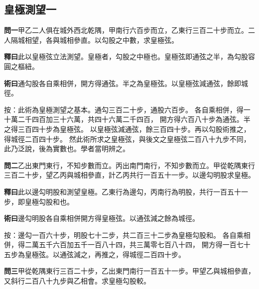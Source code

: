 \documentclass[12pt,a4paper]{article}
\newcommand{\Section}[1]{\subsection*{#1}}
\begin{document}
\Section{皇極測望一}

\noindent\textbf{問一}\quad 甲乙二人俱在城外西北乾隅，甲南行六百步而立，乙東行三百二十步而立。二人隔城相望，各與城相參直。以勾股之中數，求皇極弦。

\vspace{0.3em}

\noindent\textbf{釋曰}\quad 此以皇極弦立法測望。皇極者，勾股之中極也。皇極弦即通弦之半，為勾股容圓之樞紐。

\vspace{0.3em}

\noindent\textbf{術曰}\quad 通勾股各自乘相併，開方得通弦。半之為皇極弦。以皇極弦減通弦，餘即城徑。

\vspace{0.3em}

\noindent
按：此術為皇極測望之基本。通勾三百二十步，通股六百步。
各自乘相併，得一十萬二千四百加三十六萬，共四十六萬二千四百，
開方得六百八十步為通弦。半之得三百四十步為皇極弦。
以皇極弦減通弦，餘三百四十步。再以勾股術推之，得城徑二百四十步。
然此術所求之皇極弦，與後文之皇極弦二百八十九步不同，
此乃泛說，後為實數也。學者當明辨之。

\vspace{0.5em}

\noindent\textbf{問二}\quad 乙出東門東行，不知步數而立。丙出南門南行，不知步數而立。甲從乾隅東行三百二十步，望乙丙與城相參直，計乙丙共行一百五十一步。以邊勾明股求皇極。

\vspace{0.3em}

\noindent\textbf{釋曰}\quad 此以邊勾明股和測望皇極。乙東行為邊勾，丙南行為明股，共行一百五十一步，即皇極勾股和也。

\vspace{0.3em}

\noindent\textbf{術曰}\quad 邊勾明股各自乘相併開方得皇極弦。以通弦減之餘為城徑。

\vspace{0.3em}

\noindent
按：邊勾一百六十步，明股七十二步，共二百三十二步為皇極勾股和。
各自乘相併，得二萬五千六百加五千一百八十四，共三萬零七百八十四，
開方得一百七十五步為皇極弦。以通弦減之，再推之，得城徑二百四十步。

\vspace{0.5em}

\noindent\textbf{問三}\quad 甲從乾隅東行三百二十步，乙出東門南行一百五十一步。甲望乙與城相參直，又斜行二百八十九步與乙相會。求皇極勾股較。
\end{document}
